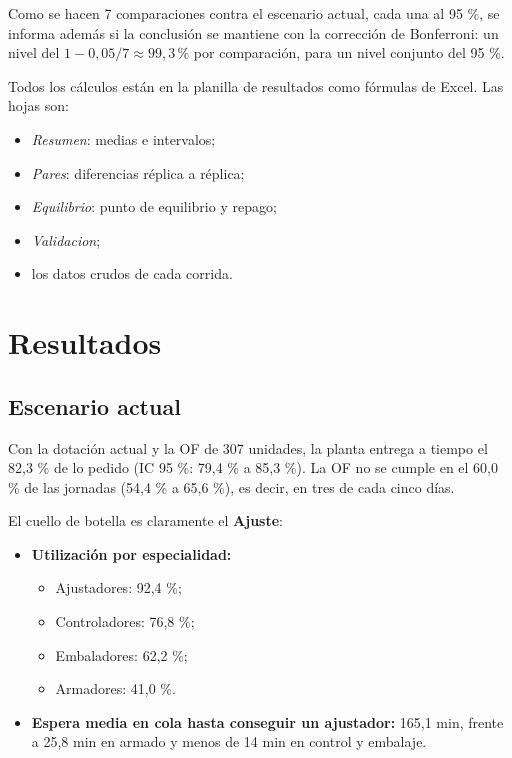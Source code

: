 \documentclass[11pt,a4paper]{article}
\begin{document}
Como se hacen 7 comparaciones contra el escenario actual, cada una al 95 \%, se informa además si la conclusión se mantiene con la corrección de Bonferroni: un nivel del $1 - 0{,}05/7 \approx 99{,}3\,\%$ por comparación, para un nivel conjunto del 95 \%.

Todos los cálculos están en la planilla de resultados como fórmulas de Excel. Las hojas son:

\begin{itemize}
\item \emph{Resumen}: medias e intervalos;
\item \emph{Pares}: diferencias réplica a réplica;
\item \emph{Equilibrio}: punto de equilibrio y repago;
\item \emph{Validacion};
\item los datos crudos de cada corrida.
\end{itemize}

\section{Resultados}

\subsection{Escenario actual}

Con la dotación actual y la OF de 307 unidades, la planta entrega a tiempo el 82,3 \% de lo pedido (IC 95 \%: 79,4 \% a 85,3 \%). La OF no se cumple en el 60,0 \% de las jornadas (54,4 \% a 65,6 \%), es decir, en tres de cada cinco días.

El cuello de botella es claramente el \textbf{Ajuste}:

\begin{itemize}
\item \textbf{Utilización por especialidad:}
\begin{itemize}
\item Ajustadores: 92,4 \%;
\item Controladores: 76,8 \%;
\item Embaladores: 62,2 \%;
\item Armadores: 41,0 \%.
\end{itemize}
\item \textbf{Espera media en cola hasta conseguir un ajustador:} 165,1 min, frente a 25,8 min en armado y menos de 14 min en control y embalaje.
\end{itemize}
\end{document}
